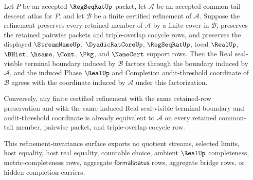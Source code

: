 \begin{theorem}
\label{thm:regseqrat-common-tail-atlas-refinement-invariance}
Let $P$ be an accepted $\RegSeqRatUp$ packet, let $\mathcal A$ be an accepted common-tail descent atlas for $P$, and let $\mathcal B$ be a finite certified refinement of $\mathcal A$. Suppose the refinement preserves every retained member of $\mathcal A$ by a finite cover in $\mathcal B$, preserves the retained pairwise packets and triple-overlap cocycle rows, and preserves the displayed $\StreamNameUp$, $\DyadicRatCoreUp$, $\RegSeqRatUp$, local $\RealUp$, $\BHist$, $\hsame$, $\Cont$, $\Pkg$, and $\NameCert$ support rows. Then the Real seal-visible terminal boundary induced by $\mathcal B$ factors through the boundary induced by $\mathcal A$, and the induced Phase $\RealUp$ and Completion audit-threshold coordinate of $\mathcal B$ agrees with the coordinate induced by $\mathcal A$ under this factorization.

Conversely, any finite certified refinement with the same retained-row preservation and with the same induced Real seal-visible terminal boundary and audit-threshold coordinate is already equivalent to $\mathcal A$ on every retained common-tail member, pairwise packet, and triple-overlap cocycle row.

This refinement-invariance surface exports no quotient streams, selected limits, host equality, host real equality, countable choice, ambient $\RealUp$ completeness, metric-completeness rows, aggregate $\mathsf{formalstatus}$ rows, aggregate bridge rows, or hidden completion carriers.
\end{theorem}

